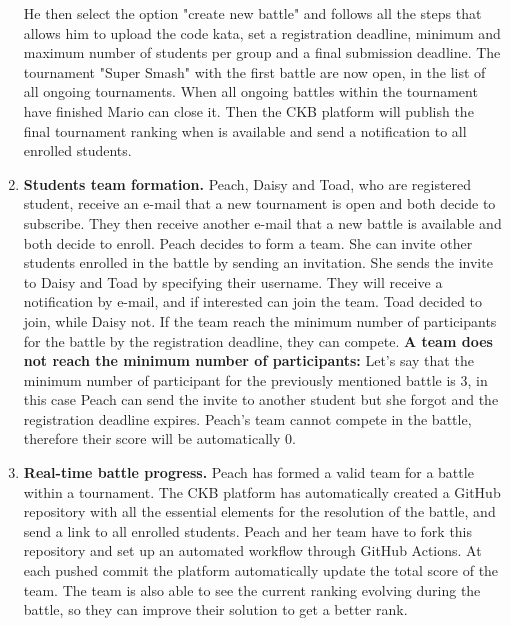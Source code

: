\begin{enumerate}[label=\textbf{SC.\arabic*}]
    He then select the option "create new battle" and follows all the steps that allows him to upload the code kata, set a registration deadline, minimum and maximum number of students per group and a final submission deadline.
    The tournament "Super Smash" with the first battle are now open, in the list of all ongoing tournaments. \newline
    When all ongoing battles within the tournament have finished Mario can close it. Then the CKB platform will publish the final tournament ranking when is available and send a notification to all enrolled students.
    \item {} \textbf{Students team formation.} \newline
    Peach, Daisy and Toad, who are registered student, receive an e-mail that a new tournament is open and both decide to subscribe. They then receive another e-mail that a new battle is available and both decide to enroll. \newline
    Peach decides to form a team. She can invite other students enrolled in the battle by sending an invitation. She sends the invite to Daisy and Toad by specifying their username. They will receive a notification by e-mail, and if interested can join the team. Toad decided to join, while Daisy not. \newline
    If the team reach the minimum number of participants for the battle by the registration deadline, they can compete. \newline
    \textbf{A team does not reach the minimum number of participants:} Let's say that the minimum number of participant for the  previously mentioned battle is 3, in this case Peach can send the invite to another student but she forgot and the registration deadline expires.
    Peach's team cannot compete in the battle, therefore their score will be automatically 0.
    \item {} \textbf{Real-time battle progress.} \newline
    Peach has formed a valid team for a battle within a tournament. The CKB platform has automatically created a GitHub repository with all the essential elements for the resolution of the battle, and send a link to all enrolled students.
    Peach and her team have to fork this repository and set up an automated workflow 
    through GitHub Actions. At each pushed commit the platform automatically update the total score of the team. The team is also able to see the current ranking evolving during the battle, so they can improve their solution to get a better rank.\newline

\end{enumerate}
